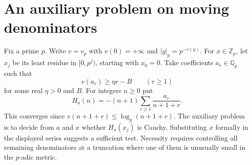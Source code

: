 \documentclass[11pt]{article}
\begin{document}
\section{An auxiliary problem on moving denominators}\label{sec:aux}
Fix a prime $p$. Write $v=v_p$ with $v(0)=+\infty$ and $|y|_p=p^{-v(y)}$.
For $x\in\mathbb Z_p$, let $x_j$ be its least residue in
$[0,p^j)$, starting with $x_0=0$. Take coefficients $a_r\in\mathbb Q_p$
such that
\begin{equation}\label{eq:weights}
                   v(a_r)\ge\eta r-B\qquad(r\ge1)
\end{equation}
for some real $\eta>0$ and $B$. For integers $n\ge0$ put
\[
 H_a(n)=-(n+1)\sum_{r\ge1}\frac{a_r}{n+1+r}.
\]
This converges since $v(n+1+r)\le\log_p(n+1+r)$. The auxiliary problem is to decide from $a$ and $x$ whether $H_a(x_j)$ is Cauchy. Substituting $x$ formally in the displayed series suggests a sufficient test. Necessity requires controlling all remaining denominators at a truncation where one of them is unusually small in the $p$-adic metric.
\end{document}
